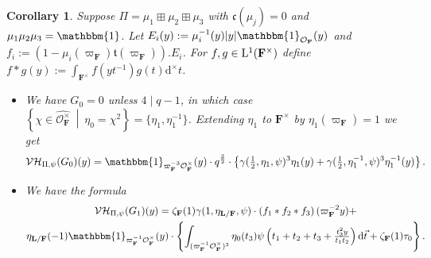 \documentclass[A4]{amsart}
\newtheorem{corollary}  [theorem]{Corollary}
\numberwithin{equation}{section} \everymath{\displaystyle}
\newcommand{\intL}{{\rm L}}
\newcommand{\id}{\mathbbm{1}}
\newcommand{\ud}{\mathrm{d}}
\newcommand{\F}{\mathbf{F}}
\newcommand{\bL}{\mathbf{L}}
\newcommand{\vO}{\mathcal{O}}
\newcommand{\norm}[1][\cdot]{\lvert #1 \rvert}
\newcommand{\VorH}{\mathcal{VH}}
\newcommand{\Trans}{\mathfrak{t}}
\newcommand{\cond}{\mathfrak{c}}
\begin{document}
\begin{corollary} \label{cor: VHQEleF2Bis}
	Suppose $\Pi = \mu_1 \boxplus \mu_2 \boxplus \mu_3$ with $\cond(\mu_j)=0$ and $\mu_1\mu_2\mu_3 = \id$. Let $E_i(y) := \mu_i^{-1}(y) \norm[y] \id_{\vO_{\F}}(y)$ and $f_i := (1 - \mu_i(\varpi_{\F}) \Trans(\varpi_{\F})).E_i$. For $f,g \in \intL^1(\F^{\times})$ define $f*g(y) := \int_{\F^{\times}} f(yt^{-1})g(t) \ud^{\times} t$.
\begin{itemize}
	\item[(1)] We have $G_0=0$ unless $4 \mid q-1$, in which case $\left\{ \chi \in \widehat{\vO_{\F}^{\times}} \ \middle| \ \eta_0 = \chi^2 \right\} = \{ \eta_1, \eta_1^{-1} \}$. Extending $\eta_1$ to $\F^{\times}$ by $\eta_1(\varpi_{\F})=1$ we get
	$$ \VorH_{\Pi,\psi}(G_0)(y) = \id_{\varpi_{\F}^{-3} \vO_{\F}^{\times}}(y) \cdot q^{\frac{3}{2}} \cdot \left\{ \gamma(\tfrac{1}{2}, \eta_1, \psi)^3 \eta_1(y) + \gamma(\tfrac{1}{2}, \eta_1^{-1}, \psi)^3 \eta_1^{-1}(y) \right\}. $$
	\item[(2)] We have the formula
\begin{multline*}
	\VorH_{\Pi,\psi}(G_1)(y) = \zeta_{\F}(1) \gamma(1,\eta_{\bL/\F},\psi) \cdot \left( f_1*f_2*f_3 \right)(\varpi_{\F}^{-2}y) + \\
	\eta_{\bL/\F}(-1) \id_{\varpi_{\F}^{-1}\vO_{\F}^{\times}}(y) \cdot \left\{ \int_{(\varpi_{\F}^{-1}\vO_{\F}^{\times})^3} \eta_0(t_3) \psi \left( t_1+t_2+t_3 + \tfrac{t_3^2y}{t_1t_2} \right) \ud \vec{t} + \zeta_{\F}(1) \tau_0 \right\}.
\end{multline*}
\end{itemize}
\end{corollary}
\end{document}
